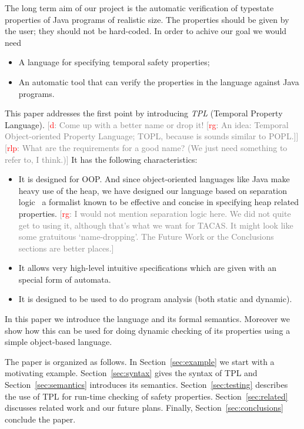 \documentclass[preprint]{sigplanconf} %
\newcommand{\note}[2]{\textcolor{gray}{[\textcolor{red}{#1}: #2]}}
\newcommand{\rg}[1]{\note{rg}{#1}}
\newcommand{\rlp}[1]{\note{rlp}{#1}}
\newcommand{\dd}[1]{\note{d}{#1}}
\newcommand{\dinocomment}[1]{\dd{#1}}
\theoremstyle{definition}
\begin{document}
The long term aim of our project is the automatic verification of typestate properties of Java programs of realistic size.  
The properties should be given by the user; they should not be hard-coded.
In order to achive our goal we would need
\begin{itemize}
\item A language for specifying temporal safety properties;
\item An automatic tool that can verify the properties in the language
  against Java programs.
\end{itemize}
This paper addresses the first point by introducing {\em TPL} (Temporal Property Language). 
\dinocomment{Come up with a better name or drop it!
\rg{An idea: Temporal Object-oriented Property Language; TOPL, because is sounds similar to POPL.}}
\rlp{What are the requirements for a good name? (We just need
  something to refer to, I think.)}
It has the following characteristics:
\begin{itemize}
\item It is designed for OOP. 
And since object-oriented languages like Java make heavy use of the heap, we have designed our language based on separation logic~\cite{reynolds2002} a formalist known to be effective and concise in specifying heap related properties.
\rg{I would not mention separation logic here.
We did not quite get to using it, although that's what we want for TACAS\null.
It might look like some gratuitous `name-dropping'.
The Future Work or the Conclusions sections are better places.}
\item It allows very high-level intuitive specifications which are given with an special form of automata.
\item It is designed to be used to do program analysis (both static and dynamic).
\end{itemize}  
In this paper we introduce the language and its formal semantics. 
Moreover we show how this can be used for doing dynamic checking of its properties using a simple object-based language.


The paper is organized as follows. In Section~\ref{sec:example} we start with a motivating example. 
Section~\ref{sec:syntax} gives the syntax of TPL and Section~\ref{sec:semantics} introduces its semantics. 
Section~\ref{sec:testing} describes the use of TPL for run-time checking of safety properties. 
Section~\ref{sec:related} discusses related work and our future plans. 
Finally, Section~\ref{sec:conclusions} conclude the paper.
\end{document}
